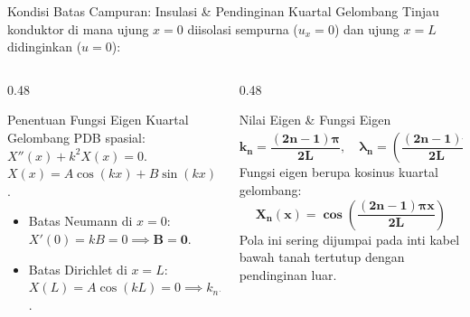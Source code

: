 \documentclass[aspectratio=169,10pt]{beamer}
\begin{document}
\begin{frame}{Kondisi Batas Campuran: Insulasi \& Pendinginan Kuartal Gelombang}
  Tinjau konduktor di mana ujung $x = 0$ diisolasi sempurna ($u_x = 0$) dan ujung $x = L$ didinginkan ($u = 0$):
  \vspace{0.1cm}
  \begin{columns}[t]
    \begin{column}{0.48\textwidth}
      \begin{block}{Penentuan Fungsi Eigen Kuartal Gelombang}
        \small
        PDB spasial: $X''(x) + k^2 X(x) = 0$.\\
        $X(x) = A\cos(kx) + B\sin(kx)$.
        \begin{itemize}
          \item Batas Neumann di $x=0$:
          $X'(0) = k B = 0 \implies \mathbf{B = 0}$.
          \item Batas Dirichlet di $x=L$:
          $X(L) = A \cos(kL) = 0 \implies k_n L = \frac{(2n-1)\pi}{2}$.
        \end{itemize}
      \end{block}
    \end{column}
    \begin{column}{0.48\textwidth}
      \begin{alertblock}{Nilai Eigen \& Fungsi Eigen}
        \small
        \begin{equation*}
          \mathbf{k_n = \frac{(2n-1)\pi}{2L}}, \quad \mathbf{\lambda_n = \left(\frac{(2n-1)\pi}{2L}\right)^2}
        \end{equation*}
        Fungsi eigen berupa kosinus kuartal gelombang:
        \begin{equation*}
          \mathbf{X_n(x) = \cos\left(\frac{(2n-1)\pi x}{2L}\right)}
        \end{equation*}
        Pola ini sering dijumpai pada inti kabel bawah tanah tertutup dengan pendinginan luar.
      \end{alertblock}
    \end{column}
  \end{columns}
\end{frame}
\end{document}
